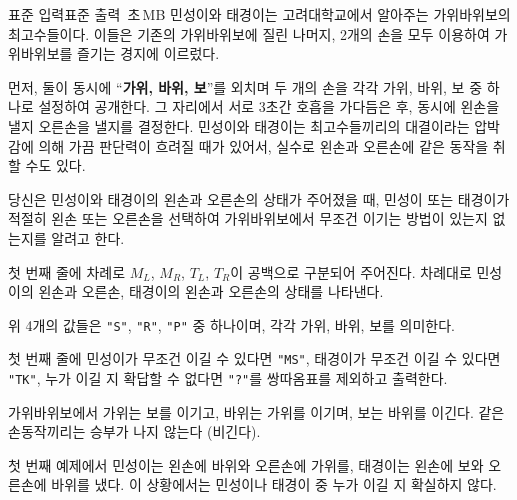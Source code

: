 \begin{problem}{\kcpchandstitle}
    {표준 입력}{표준 출력}
    {\kcpchandstime\,초}{\kcpchandsmemory\,MB}{}{\kcpchandsscore}
    민성이와 태경이는 고려대학교에서 알아주는 가위바위보의 최고수들이다. 이들은 기존의 가위바위보에 질린 나머지, 2개의 손을 모두 이용하여 가위바위보를 즐기는 경지에 이르렀다.
    
    먼저, 둘이 동시에 ``\textbf{가위, 바위, 보}”를 외치며 두 개의 손을 각각 가위, 바위, 보 중 하나로 설정하여 공개한다. 그 자리에서 서로 3초간 호흡을 가다듬은 후, 동시에 왼손을 낼지 오른손을 낼지를 결정한다. 민성이와 태경이는 최고수들끼리의 대결이라는 압박감에 의해 가끔 판단력이 흐려질 때가 있어서, 실수로 왼손과 오른손에 같은 동작을 취할 수도 있다.
    
    당신은 민성이와 태경이의 왼손과 오른손의 상태가 주어졌을 때, 민성이 또는 태경이가 적절히 왼손 또는 오른손을 선택하여 가위바위보에서 무조건 이기는 방법이 있는지 없는지를 알려고 한다.
    
    \InputFile
    첫 번째 줄에 차례로 $ M_L $, $ M_R $, $ T_L $, $ T_R $이 공백으로 구분되어 주어진다. 차례대로 민성이의 왼손과 오른손, 태경이의 왼손과 오른손의 상태를 나타낸다.
    
    위 4개의 값들은 \verb|"S"|, \verb|"R"|, \verb|"P"| 중 하나이며, 각각 가위, 바위, 보를 의미한다.
    
    
    \OutputFile
    첫 번째 줄에 민성이가 무조건 이길 수 있다면 \verb|"MS"|, 태경이가 무조건 이길 수 있다면 \verb|"TK"|, 누가 이길 지 확답할 수 없다면 \verb|"?"|를 쌍따옴표를 제외하고 출력한다.
    
    가위바위보에서 가위는 보를 이기고, 바위는 가위를 이기며, 보는 바위를 이긴다. 같은 손동작끼리는 승부가 나지 않는다 (비긴다).
    

    \Examples
    
    \begin{example}
    \end{example}
    
    \Explanation
    첫 번째 예제에서 민성이는 왼손에 바위와 오른손에 가위를, 태경이는 왼손에 보와 오른손에 바위를 냈다. 이 상황에서는 민성이나 태경이 중 누가 이길 지 확실하지 않다.
    
\end{problem}

